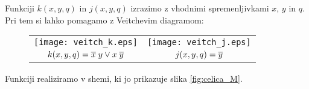 \begin{resitev}
Funkciji $k(x,y,q)$  in $j(x,y,q)$ izrazimo z vhodnimi spremenljivkami $x$, $y$ in $q$. Pri tem si lahko pomagamo z Veitchevim diagramom:

\begin{figure}[!ht]
\begin{center}
\begin{tabular}{cc}
\texttt{[image: veitch\_k.eps]} &
\texttt{[image: veitch\_j.eps]} \\
$k(x,y,q) = \overline x \; y \vee x \; \overline y$ & $j(x,y,q) = \overline y$\\
\end{tabular}
\end{center}
\end{figure}

\bigskip

Funkciji realiziramo v shemi, ki jo prikazuje slika \ref{fig:celica_M}.
\end{resitev}

